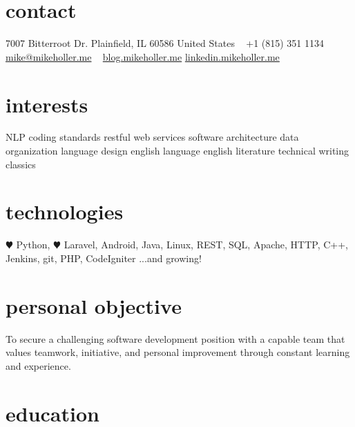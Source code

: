 \documentclass[]{friggeri-cv} %
\begin{document}


\begin{aside} %
\section{contact}
7007 Bitterroot Dr.
Plainfield, IL 60586
United States
~
+1 (815) 351 1134
~
\href{mailto:mike@mikeholler.me}{mike@mikeholler.me}
~
\href{http://blog.mikeholler.me}{blog.mikeholler.me}
\href{http://linkedin.mikeholler.me}{linkedin.mikeholler.me}
\section{interests}
NLP
coding standards
restful web services
software architecture
data organization
language design
english language
english literature
technical writing
classics
\section{technologies}
{\color{red} $\varheartsuit$} Python, {\color{red} $\varheartsuit$} Laravel,
Android, Java, Linux,
REST, SQL, Apache,
HTTP, C++, Jenkins,
git, PHP, CodeIgniter
...and growing!
\end{aside}

\section{personal objective}
To secure a challenging software development position with a capable team that values
teamwork, initiative, and personal improvement through constant learning and experience.


\section{education}
\end{document}
